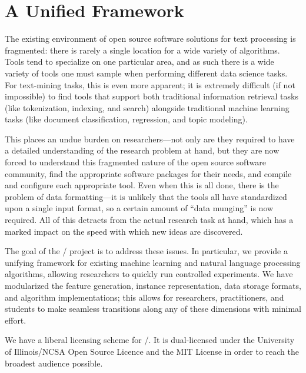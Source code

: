 \section{A Unified Framework}
\label{sec:framework}

The existing environment of open source software solutions for text processing
is fragmented: there is rarely a single location for a wide variety of
algorithms. Tools tend to specialize on one particular area, and as such there
is a wide variety of tools one must sample when performing different data
science tasks. For text-mining tasks, this is even more apparent; it is
extremely difficult (if not impossible) to find tools that support both
traditional information retrieval tasks (like tokenization, indexing, and
search) alongside traditional machine learning tasks (like document
classification, regression, and topic modeling).

This places an undue burden on researchers---not only are they required to have
a detailed understanding of the research problem at hand, but they are now
forced to understand this fragmented nature of the open source software
community, find the appropriate software packages for their needs, and compile
and configure each appropriate tool. Even when this is all done, there is the
problem of data formatting---it is unlikely that the tools all have standardized
upon a single input format, so a certain amount of ``data munging'' is now
required. All of this detracts from the actual research task at hand, which has
a marked impact on the speed with which new ideas are discovered.

The goal of the \meta/ project is to address these issues. In particular, we
provide a unifying framework for existing machine learning and natural language
processing algorithms, allowing researchers to quickly run controlled
experiments. We have modularized the feature generation, instance
representation, data storage formats, and algorithm implementations; this allows
for researchers, practitioners, and students to make seamless transitions along
any of these dimensions with minimal effort.

We have a liberal licensing scheme for \meta/. It is dual-licensed under the
University of Illinois/NCSA Open Source Licence and the MIT License in order to
reach the broadest audience possible.

